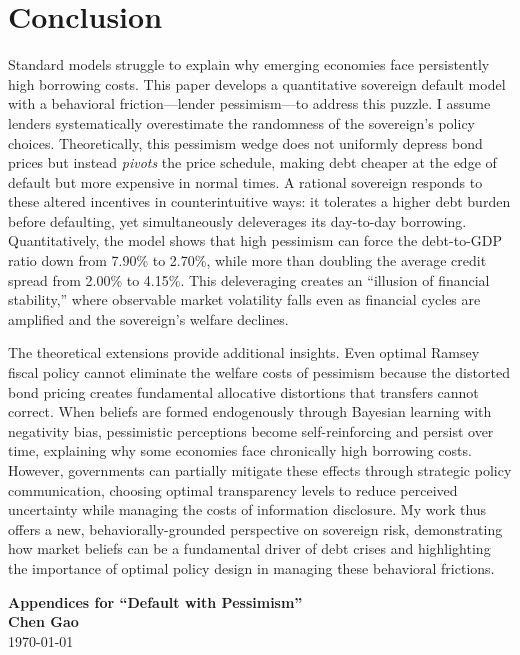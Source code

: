 \documentclass[12pt]{article}
\theoremstyle{plain}
\begin{document}
\section{Conclusion}

Standard models struggle to explain why emerging economies face persistently
high borrowing costs. This paper develops a quantitative sovereign default
model with a behavioral friction---lender pessimism---to address this puzzle. I
assume lenders systematically overestimate the randomness of the sovereign's
policy choices. Theoretically, this pessimism wedge does not uniformly depress
bond prices but instead \textit{pivots} the price schedule, making debt cheaper
at the edge of default but more expensive in normal times. A rational sovereign
responds to these altered incentives in counterintuitive ways: it tolerates a
higher debt burden before defaulting, yet simultaneously deleverages its
day-to-day borrowing. Quantitatively, the model shows that high pessimism can
force the debt-to-GDP ratio down from 7.90\% to 2.70\%, while more than
doubling the average credit spread from 2.00\% to 4.15\%. This deleveraging
creates an ``illusion of financial stability,'' where observable market
volatility falls even as financial cycles are amplified and the sovereign's
welfare declines.

The theoretical extensions provide additional insights. Even optimal Ramsey
fiscal policy cannot eliminate the welfare costs of pessimism because the
distorted bond pricing creates fundamental allocative distortions that
transfers cannot correct. When beliefs are formed endogenously through Bayesian
learning with negativity bias, pessimistic perceptions become self-reinforcing
and persist over time, explaining why some economies face chronically high
borrowing costs. However, governments can partially mitigate these effects
through strategic policy communication, choosing optimal transparency levels to
reduce perceived uncertainty while managing the costs of information
disclosure. My work thus offers a new, behaviorally-grounded perspective on
sovereign risk, demonstrating how market beliefs can be a fundamental driver of
debt crises and highlighting the importance of optimal policy design in
managing these behavioral frictions.

\clearpage
\appendix

\setcounter{equation}{0}
\renewcommand{\theequation}{\thesection.\arabic{equation}}

\begin{center}
	\Large \textbf{Appendices for ``Default with Pessimism''}\\
	\vspace{0.5cm}
	\large \textbf{Chen Gao}
	\\
	\large \today
\end{center}
\end{document}
